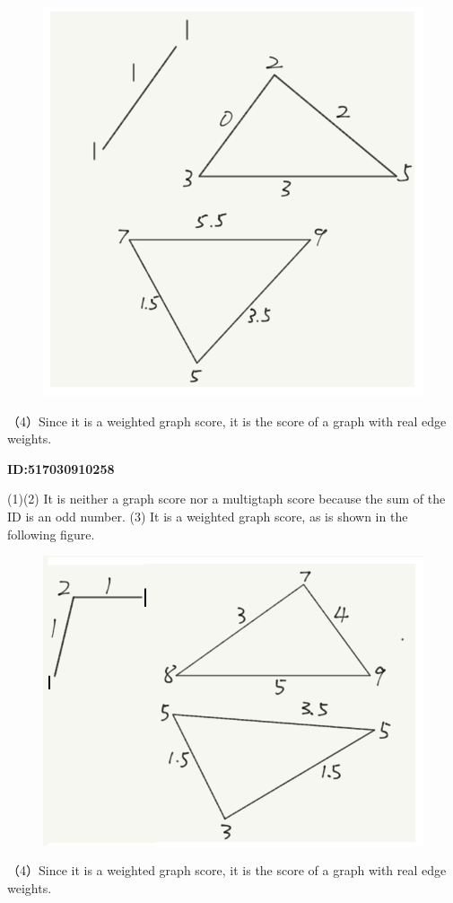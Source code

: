 \documentclass{article} %
\begin{document}
	\begin{figure}[H]
		\centering
		\includegraphics[scale=0.6]{10250.png}
		\caption{}
		\label{fig:1}
	\end{figure}
	（4）Since it is a weighted graph score, it is the score of a graph with real edge weights.

	\textbf{ID:517030910258}\par
	(1)(2) It is neither a graph score nor a multigtaph score because the sum of the ID is an odd number.
	(3) It is a weighted graph score, as is shown in the following figure.
	
	\begin{figure}[H]
		\centering
		\includegraphics[scale=0.6]{10258.png}
		\caption{}
		\label{fig:2}
	\end{figure}
	（4）Since it is a weighted graph score, it is the score of a graph with real edge weights.
\end{document}
